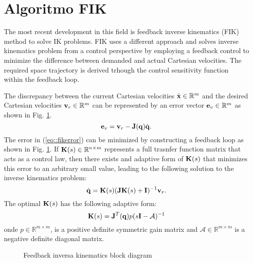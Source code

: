\section{Algoritmo FIK}

The most recent development in this field is feedback inverse kinematics (FIK) method \cite{P:08} to solve IK problems. FIK uses a different approach and solves inverse kinematics problem from a control perspective by employing a feedback control to minimize the difference between demanded and actual Cartesian velocities. The required space trajectory is derived trhough the control sensitivity function within the feedback loop.

The discrepancy between the current Cartesian velocities $\dot{\bf x}\in {\mathbb R}^m$ and the desired Cartesian velocities ${\bf v}_r \in {\mathbb R}^m$ can be represented by an error vector ${\bf e}_v \in {\mathbb R}^m$ as shown in Fig. \ref{fig::fikdiag}.
%
\begin{equation}
\label{eq::fikerror}
{\bf e}_v = {\bf v}_r - {\bf J}({\bf q})\dot{{\bf q}}.
\end{equation} 
%
The error in (\ref{eq::fikerror}) can be minimized by constructing a feedback loop as shown in Fig. \ref{fig::fikdiag}. If ${\bf K}(s)\in {\mathbb R}^{n \times m}$ represents a full trasnfer function matrix that acts as a control law, then there exists and adaptive form of ${\bf K}(s)$ that minimizes this error to an arbitrary small value, leading to the following solution to the inverse kinematics problem:
%
\begin{equation}
\label{eq::fiklaw}
\dot{\bf q} = {\bf K}(s)({\bf J}{\bf K}(s) + {\bf I})^{-1}{\bf v}_r.
\end{equation} 
%
The optimal ${\bf K}(s)$ has the following adaptive form:
%
\begin{equation}
\label{eq::fikK}
{\bf K}(s) = {\bf J}^T({\bf q})p(s{\bf I} - {\mathcal A})^{-1}
\end{equation}
%
onde $p \in {\mathbb R}^{m \times m}$, is a positive definite symmetric gain matrix and ${\mathcal A} \in {\mathbb R}^{m \times m}$ is a negative definite diagonal matrix.
%

\begin{figure}[htpb]
  \centering
  \def\JPicScale{0.8}
  {\small
  
  }
  \caption{Feedback inversa kinematics block diagram}
  \label{fig::fikdiag}
\end{figure}

